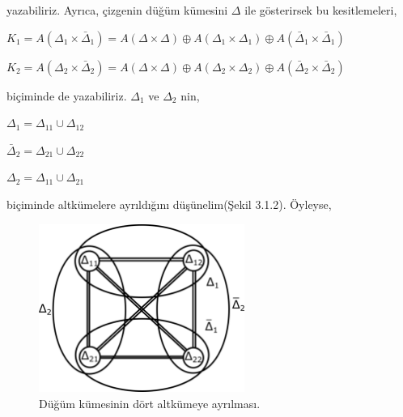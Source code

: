 \documentclass{article}
\begin{document}
    yazabiliriz. Ayrıca, çizgenin düğüm kümesini $\Delta$ ile gösterirsek bu kesitlemeleri,
    \begin{center}
        $K_{1}=A(\Delta_{1}\times \bar\Delta_{1})=A(\Delta\times \Delta) \oplus A(\Delta_{1}\times \Delta_{1}) \oplus A(\bar\Delta_{1}\times \bar\Delta_{1})$\\
    \end{center}
    \begin{center}
        $K_{2}=A(\Delta_{2}\times \bar\Delta_{2})=A(\Delta\times \Delta) \oplus A(\Delta_{2}\times \Delta_{2}) \oplus A(\bar\Delta_{2}\times \bar\Delta_{2})$\\
    \end{center}
    biçiminde de yazabiliriz. $\Delta_{1}$ ve $\Delta_{2}$ nin,
    \begin{center}
        $\Delta_{1} = \Delta_{11} \cup \Delta_{12}$ 
    \end{center}
    \begin{center}
        $\bar\Delta_{2} = \Delta_{21} \cup \Delta_{22}$\\
    \end{center}
    \begin{center}
        $\Delta_{2} = \Delta_{11} \cup \Delta_{21}$\\
    \end{center}
    biçiminde altkümelere ayrıldığını düşünelim(Şekil 3.1.2). Öyleyse,
    
    \begin{figure}[h]
        \centering
        \includegraphics[width=0.6\textwidth]{images/ceyhun-120-fig01.pdf}
        \caption{Düğüm kümesinin dört altkümeye ayrılması.}
        \label{fig:drawing2}
    \end{figure}
\end{document}
